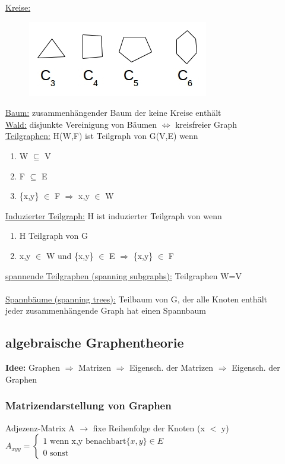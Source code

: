 \underline{Kreise:}
\begin{figure}[htp]
\centering
\includegraphics[scale=1]{lectures/161021/pix/pic10.jpg}
\end{figure}

\underline{Baum:} zusammenhängender Baum der keine Kreise enthält\\
\underline{Wald:} disjunkte Vereinigung von Bäumen $\Leftrightarrow$ kreisfreier Graph\\
\underline{Teilgraphen:} H(W,F) ist Teilgraph von G(V,E) wenn
\begin{enumerate}
	\item W $\subseteq$ V
	\item F $\subseteq$ E
	\item \{x,y\} $\in$ F $\Rightarrow$ x,y $\in$ W
\end{enumerate}

\underline{Induzierter Teilgraph:} H ist induzierter Teilgraph von wenn
\begin{enumerate}
	\item H Teilgraph von G
	\item x,y $\in$ W und \{x,y\} $\in$ E $\Rightarrow$ \{x,y\} $\in$ F
\end{enumerate}

\underline{spannende Teilgraphen (spanning subgraphs):} Teilgraphen W=V
\\\\
\underline{Spannbäume (spanning trees):} Teilbaum von G, der alle Knoten enthält\\
jeder zusammenhängende Graph hat einen Spannbaum

\subsection{algebraische Graphentheorie}
\textbf{Idee:} Graphen $\Rightarrow$ Matrizen $\Rightarrow$ Eigensch. der Matrizen $\Rightarrow$ Eigensch. der Graphen
\subsubsection{Matrizendarstellung von Graphen}
Adjezenz-Matrix A $\rightarrow$ fixe Reihenfolge der Knoten (x $<$ y)\\
$A_{xyy}=
	\begin{cases}
		\text{1 wenn x,y benachbart} \{x,y\} \in E\\
		\text{0 sonst}
	\end{cases}
$

